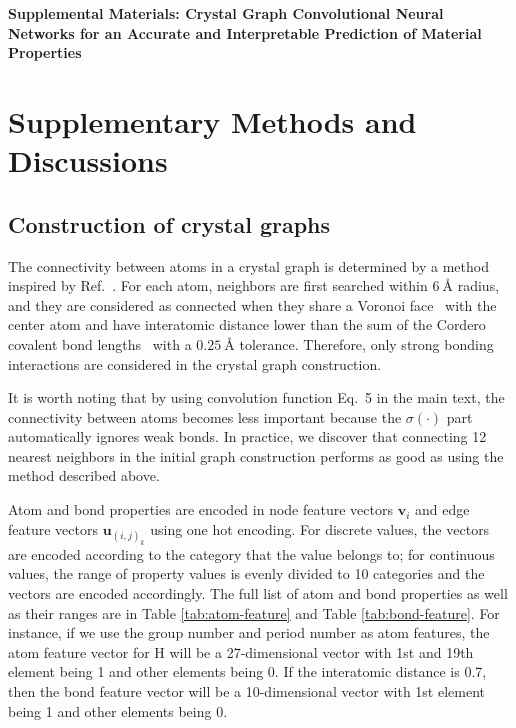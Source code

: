 \documentclass[twocolumn, prl]{revtex4-1}
\begin{document}
\widetext
\clearpage

\begin{center}
\textbf{\large Supplemental Materials: Crystal Graph Convolutional Neural Networks for an Accurate and Interpretable Prediction of Material Properties}
\end{center}
\setcounter{equation}{0}
\setcounter{figure}{0}
\setcounter{table}{0}
\setcounter{page}{1}
\makeatletter
\renewcommand{\theequation}{S\arabic{equation}}
\renewcommand{\thefigure}{S\arabic{figure}}
\renewcommand{\bibnumfmt}[1]{[S#1]}
\renewcommand{\citenumfont}[1]{S#1}

\section{Supplementary Methods and Discussions}

\subsection{Construction of crystal graphs}

The connectivity between atoms in a crystal graph is determined by a method inspired by Ref.~\cite{isayev2017universal}. For each atom, neighbors are first searched within $\SI{6}{\angstrom}$ radius, and they are considered as connected when they share a Voronoi face~\cite{blatov2004voronoi} with the center atom and have interatomic distance lower than the sum of the Cordero covalent bond lengths~\cite{cordero2008covalent} with a $\SI{0.25}{\angstrom}$ tolerance. Therefore, only strong bonding interactions are considered in the crystal graph construction.

It is worth noting that by using convolution function Eq.~5 in the main text, the connectivity between atoms becomes less important because the $\sigma(\bm{\cdot})$ part automatically ignores weak bonds. In practice, we discover that connecting 12 nearest neighbors in the initial graph construction performs as good as using the method described above.

 Atom and bond properties are encoded in node feature vectors $\bm{v}_i$ and edge feature vectors $\bm{u}_{(i, j)_k}$ using one hot encoding. For discrete values, the vectors are encoded according to the category that the value belongs to; for continuous values, the range of property values is evenly divided to 10 categories and the vectors are encoded accordingly. The full list of atom and bond properties as well as their ranges are in Table \ref{tab:atom-feature} and Table \ref{tab:bond-feature}. For instance, if we use the group number and period number as atom features, the atom feature vector for H will be a 27-dimensional vector with 1st and 19th element being 1 and other elements being 0. If the interatomic distance is 0.7, then the bond feature vector will be a 10-dimensional vector with 1st element being 1 and other elements being 0.
\end{document}
